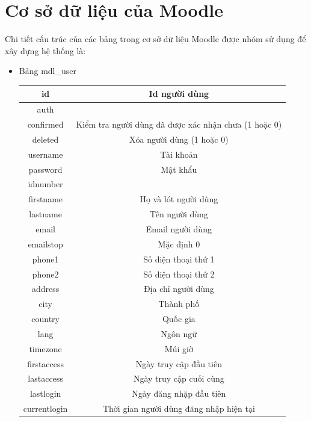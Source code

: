 \newpage
\section{Cơ sở dữ liệu của Moodle}

Chi tiết cấu trúc của các bảng trong cơ sở dữ liệu Moodle được nhóm sử dụng để xây dựng hệ thống là:

\begin{itemize}
	\item Bảng mdl\_user
	\begin{center}
		\begin{table}[!htp]
			\centering
			\begin{tabular}{|c|c|}
				\hline 
				id & Id người dùng \\ 
				\hline 
				auth &  \\ 
				\hline 
				confirmed & Kiểm tra người dùng đã được xác nhận chưa (1 hoặc 0) \\ 
				\hline 
				deleted & Xóa người dùng (1 hoặc 0) \\ 
				\hline 
				username & Tài khoản \\ 
				\hline 
				password & Mật khẩu \\ 
				\hline 
				idnumber &  \\ 
				\hline 
				firstname & Họ và lót người dùng \\ 
				\hline 
				lastname & Tên người dùng \\ 
				\hline 
				email & Email người dùng \\ 
				\hline 
				emailstop & Mặc định 0 \\ 
				\hline 
				phone1 & Số điện thoại thứ 1 \\ 
				\hline 
				phone2 & Số điện thoại thứ 2 \\
				\hline 
				address & Địa chỉ người dùng \\ 
				\hline 
				city & Thành phố \\ 
				\hline 
				country & Quốc gia \\ 
				\hline 
				lang & Ngôn ngữ \\
				\hline 
				timezone & Múi giờ \\ 
				\hline 
				firstaccess & Ngày truy cập đầu tiên \\ 
				\hline 
				lastaccess & Ngày truy cập cuối cùng \\ 
				\hline 
				lastlogin & Ngày đăng nhặp đầu tiên \\ 
				\hline 
				currentlogin & Thời gian người dùng đăng nhập hiện tại \\ 

\end{tabular}
\end{table}
\end{center}
\end{itemize}
